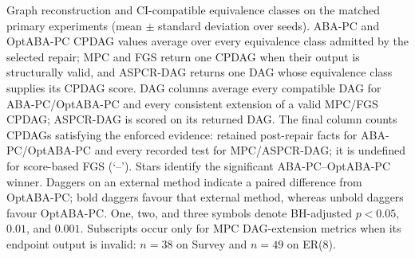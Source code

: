 \begin{table}[t]
\caption{Graph reconstruction and CI-compatible equivalence classes on the matched primary experiments (mean $\pm$ standard deviation over seeds). ABA-PC and OptABA-PC CPDAG values average over every equivalence class admitted by the selected repair; MPC and FGS return one CPDAG when their output is structurally valid, and ASPCR-DAG returns one DAG whose equivalence class supplies its CPDAG score. DAG columns average every compatible DAG for ABA-PC/OptABA-PC and every consistent extension of a valid MPC/FGS CPDAG; ASPCR-DAG is scored on its returned DAG. The final column counts CPDAGs satisfying the enforced evidence: retained post-repair facts for ABA-PC/OptABA-PC and every recorded test for MPC/ASPCR-DAG; it is undefined for score-based FGS (`--'). Stars identify the significant ABA-PC--OptABA-PC winner. Daggers on an external method indicate a paired difference from OptABA-PC; bold daggers favour that external method, whereas unbold daggers favour OptABA-PC. One, two, and three symbols denote BH-adjusted $p<0.05$, $0.01$, and $0.001$. Subscripts occur only for MPC DAG-extension metrics when its endpoint output is invalid: $n=38$ on Survey and $n=49$ on ER(8).}
\label{tab:final-graph-metrics}
\end{table}
